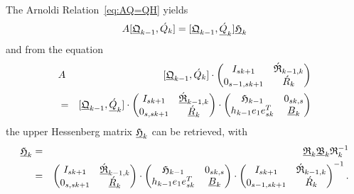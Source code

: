 \documentclass{scrartcl}
\numberwithin{equation}{section}
\begin{document}
The Arnoldi Relation~\eqref{eq:AQ=QH} yields
\begin{eqnarray*}
	A [\underline{\frak{Q}}_{k - 1}, \acute{Q}_k] = [ \underline{\frak{Q}}_{k - 1}, \underline{\acute{Q}}_k ] \underline{\frak{H}}_k
\end{eqnarray*}
and from the equation
\begin{eqnarray}
&A& [\underline{\frak{Q}}_{k - 1}, \acute{Q}_k] \cdot 
\begin{pmatrix}
	I_{sk + 1} & \acute{\frak{R}}_{k - 1, k} \\
	0_{s - 1, sk + 1} &\acute{R}_k \\
\end{pmatrix} \nonumber \\
&=& [ \underline{\frak{Q}}_{k - 1}, \underline{\acute{Q}}_k ] \cdot 
\begin{pmatrix}
	I_{sk + 1} & \underline{\acute{\frak{R}}}_{k - 1, k} \\
	0_{s, sk + 1} & \underline{\acute{R}}_k \\
\end{pmatrix} \cdot
\begin{pmatrix}
	\frak{H}_{k - 1} & 0_{sk, s} \\
	h_{k - 1} e_1 e^T_{sk} & \underline{B}_k \\
\end{pmatrix}
\end{eqnarray}
the upper Hessenberg matrix $\underline{\frak{H}}_k$ can be retrieved, with
\begin{eqnarray} \label{eq:AQR=QRB}
	\underline{\frak{H}}_k &=& \underline{\frak{R}}_k \underline{\frak{B}}_k \frak{R}^{-1}_k \nonumber\\
	&=& 
	\begin{pmatrix}
		I_{sk + 1} & \underline{\acute{\frak{R}}}_{k - 1, k} \\
		0_{s, sk + 1} & \underline{\acute{R}}_k \\
	\end{pmatrix} \cdot
	\begin{pmatrix}
		\frak{H}_{k - 1} & 0_{sk, s} \\
		h_{k - 1} e_1 e^T_{sk} & \underline{B}_k \\
	\end{pmatrix} \cdot
	\begin{pmatrix}
		I_{sk + 1} & \acute{\frak{R}}_{k - 1, k} \\
		0_{s - 1, sk + 1} &\acute{R}_k \\
	\end{pmatrix}^{-1}.
\end{eqnarray}
\end{document}
